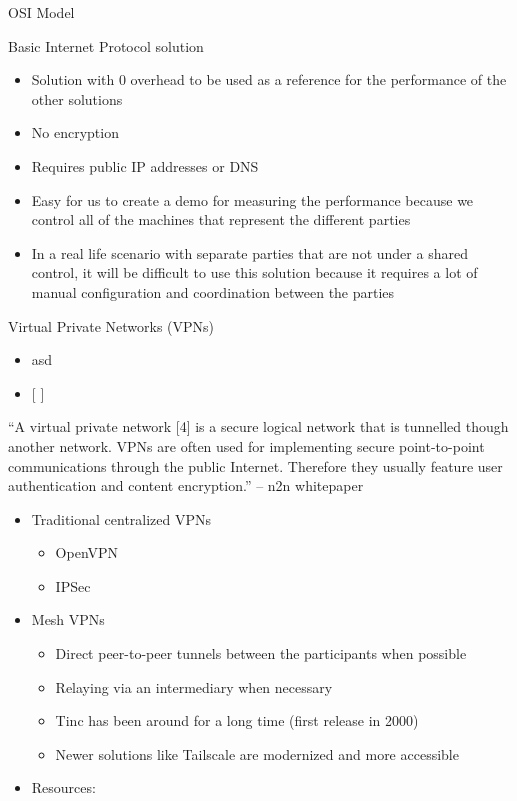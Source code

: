 \begin{frame}[fragile]{OSI Model}
\begin{block}{Basic Internet Protocol solution}
\protect\hypertarget{basic-internet-protocol-solution}{}
\begin{itemize}
\tightlist
\item
  Solution with 0 overhead to be used as a reference for the performance
  of the other solutions
\item
  No encryption
\item
  Requires public IP addresses or DNS
\item
  Easy for us to create a demo for measuring the performance because we
  control all of the machines that represent the different parties
\item
  In a real life scenario with separate parties that are not under a
  shared control, it will be difficult to use this solution because it
  requires a lot of manual configuration and coordination between the
  parties
\end{itemize}
\end{block}

\begin{block}{Virtual Private Networks (VPNs)}
\protect\hypertarget{virtual-private-networks-vpns}{}
\begin{itemize}
\item
  asd
\item
  {[} {]}
\end{itemize}

``A virtual private network {[}4{]} is a secure logical network that is
tunnelled though another network. VPNs are often used for implementing
secure point-to-point communications through the public Internet.
Therefore they usually feature user authentication and content
encryption.'' -- n2n whitepaper

\begin{itemize}
\item
  Traditional centralized VPNs

  \begin{itemize}
  \tightlist
  \item
    OpenVPN
  \item
    IPSec
  \end{itemize}
\item
  Mesh VPNs

  \begin{itemize}
  \tightlist
  \item
    Direct peer-to-peer tunnels between the participants when possible
  \item
    Relaying via an intermediary when necessary
  \item
    Tinc has been around for a long time (first release in 2000)
  \item
    Newer solutions like Tailscale are modernized and more accessible
  \end{itemize}
\item
  Resources:


\end{itemize}
\end{block}
\end{frame}
